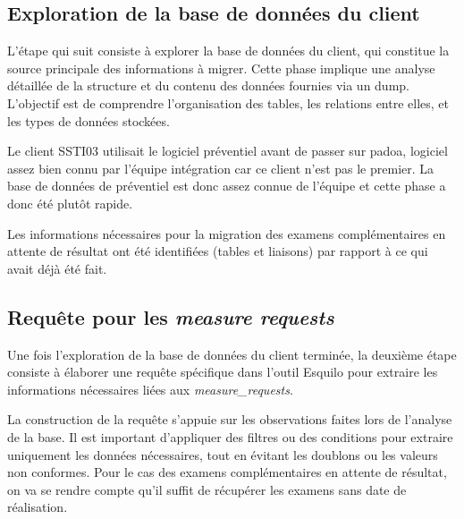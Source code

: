 \subsection{Exploration de la base de données du client}

L'étape qui suit consiste à explorer la base de données du client, qui constitue la source principale des informations à migrer. Cette phase implique une analyse détaillée de la structure et du contenu des données fournies via un dump. L'objectif est de comprendre l'organisation des tables, les relations entre elles, et les types de données stockées. 

Le client SSTI03 utilisait le logiciel préventiel avant de passer sur padoa, logiciel assez bien connu par l'équipe intégration car ce client n'est pas le premier. La base de données de préventiel est donc assez connue de l'équipe et cette phase a donc été plutôt rapide.

Les informations nécessaires pour la migration des examens complémentaires en attente de résultat ont été identifiées (tables et liaisons) par rapport à ce qui avait déjà été fait.


\subsection{Requête pour les \textit{measure requests}}

Une fois l’exploration de la base de données du client terminée, la deuxième étape consiste à élaborer une requête spécifique dans l’outil Esquilo pour extraire les informations nécessaires liées aux \textit{measure\_requests}. 

La construction de la requête s’appuie sur les observations faites lors de l’analyse de la base. Il est important d’appliquer des filtres ou des conditions pour extraire uniquement les données nécessaires, tout en évitant les doublons ou les valeurs non conformes. Pour le cas des examens complémentaires en attente de résultat, on va se rendre compte qu'il suffit de récupérer les examens sans date de réalisation.

